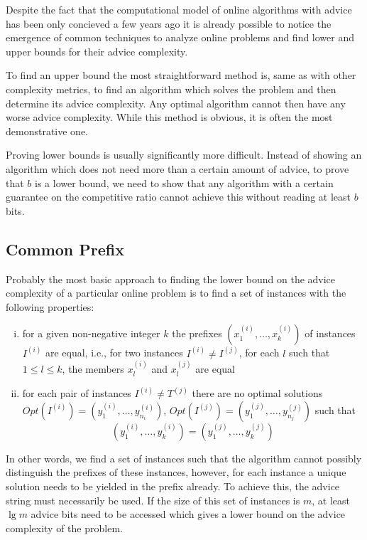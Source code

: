 Despite the fact that the computational model of online algorithms with
advice has been only concieved a few years ago it is already possible to
notice the emergence of common techniques to analyze online problems and
find lower and upper bounds for their advice complexity.

To find an upper bound the most straightforward method is, same as with
other complexity metrics, to find an algorithm which solves the problem
and then determine its advice complexity. Any optimal algorithm cannot
then have any worse advice complexity. While this method is obvious, it is
often the most demonstrative one.

Proving lower bounds is usually significantly more difficult. Instead of
showing an algorithm which does not need more than a certain amount of
advice, to prove that $b$ is a lower bound, we need to show that any
algorithm with a certain guarantee on the competitive ratio cannot achieve
this without reading at least $b$ bits.

\subsection{Common Prefix}
\label{section:common-prefix}

Probably the most basic approach to finding the lower bound on the advice
complexity of a particular online problem is to find a set of instances
with the following properties:

\begin{enumerate}[(i)]
    \item
    for a given non-negative integer $k$ the prefixes $(x_1^{(i)}, \dots,
    x_k^{(i)})$ of instances $I^{(i)}$ are equal, i.e., for two instances
    $I^{(i)} \not= I^{(j)}$, for each $l$ such that $1 \leq l \leq k$,
    the members $x_l^{(i)}$ and $x_l^{(j)}$ are equal

    \item
    for each pair of instances $I^{(i)} \not= T^{(j)}$ there are no
    optimal solutions $Opt(I^{(i)}) = (y_1^{(i)}, \dots, y_{n_i}^{(i)})$,
    $Opt(I^{(j)}) = (y_1^{(j)}, \dots, y_{n_j}^{(j)})$ such that
    $$
        (y_1^{(i)}, \dots, y_{k}^{(i)}) = (y_1^{(j)}, \dots, y_{k}^{(j)})
    $$
\end{enumerate}

In other words, we find a set of instances such that the algorithm cannot
possibly distinguish the prefixes of these instances, however, for each
instance a unique solution needs to be yielded in the prefix already. To
achieve this, the advice string must necessarily be used. If the size of
this set of instances is $m$, at least $\lg m$ advice bits need to be
accessed which gives a lower bound on the advice complexity of the
problem.

